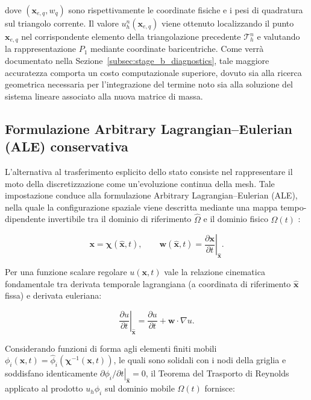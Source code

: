 dove $(\mathbf{x}_{e,q},w_q)$ sono rispettivamente le coordinate fisiche e i pesi di quadratura sul triangolo corrente. Il valore $u_h^n(\mathbf{x}_{e,q})$ viene ottenuto localizzando il punto $\mathbf{x}_{e,q}$ nel corrispondente elemento della triangolazione precedente $\mathcal{T}_h^n$ e valutando la rappresentazione $P_1$ mediante coordinate baricentriche. Come verrà documentato nella Sezione~\ref{subsec:stage_b_diagnostics}, tale maggiore accuratezza comporta un costo computazionale superiore, dovuto sia alla ricerca geometrica necessaria per l'integrazione del termine noto sia alla soluzione del sistema lineare associato alla nuova matrice di massa.

\subsection{Formulazione Arbitrary Lagrangian--Eulerian (ALE) conservativa}
\label{subsec:ale_formulation}

L'alternativa al trasferimento esplicito dello stato consiste nel rappresentare il moto della discretizzazione come un'evoluzione continua della mesh. Tale impostazione conduce alla formulazione Arbitrary Lagrangian--Eulerian (ALE), nella quale la configurazione spaziale viene descritta mediante una mappa tempo-dipendente invertibile tra il dominio di riferimento $\widehat{\Omega}$ e il dominio fisico $\Omega(t)$ \citep{hirt1974an,donea2004arbitrary}:

\begin{equation}
\mathbf{x}
=
\boldsymbol{\chi}(\widehat{\mathbf{x}},t),
\qquad
\mathbf{w}(\widehat{\mathbf{x}},t)
=
\left.
\frac{\partial\mathbf{x}}
{\partial t}
\right|_{\widehat{\mathbf{x}}}.
\label{eq:ale_mapping}
\end{equation}

Per una funzione scalare regolare $u(\mathbf{x},t)$ vale la relazione cinematica fondamentale tra derivata temporale lagrangiana (a coordinata di riferimento $\widehat{\mathbf{x}}$ fissa) e derivata euleriana:

\begin{equation}
\left.
\frac{\partial u}
{\partial t}
\right|_{\widehat{\mathbf{x}}}
=
\frac{\partial u}{\partial t}
+
\mathbf{w}\cdot\nabla u.
\label{eq:ale_chain_rule}
\end{equation}

Considerando funzioni di forma agli elementi finiti mobili $\phi_i(\mathbf{x},t) = \allowbreak \widehat{\phi}_i(\boldsymbol{\chi}^{-1}(\mathbf{x},t))$, le quali sono solidali con i nodi della griglia e soddisfano identicamente $\left.\partial\phi_i/\partial t\right|_{\widehat{\mathbf{x}}} = 0$, il Teorema del Trasporto di Reynolds applicato al prodotto $u_h\phi_i$ sul dominio mobile $\Omega(t)$ fornisce:

